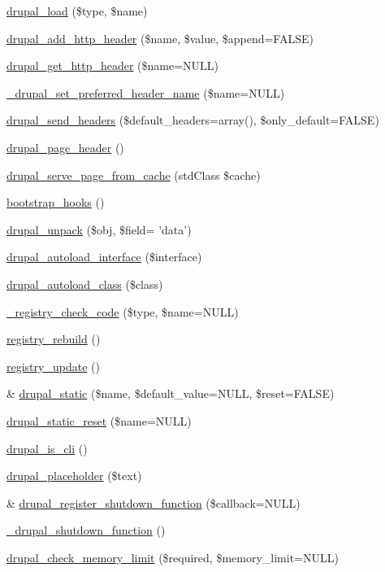 \begin{DoxyCompactItemize}
\item 
\hyperlink{bootstrap_8inc_a13a2254228f213a980dc1f09886b8802}{drupal\_\-load} (\$type, \$name)
\item 
\hyperlink{bootstrap_8inc_ad4ff2b2cf5a2fb632c2c869bc1a5a70f}{drupal\_\-add\_\-http\_\-header} (\$name, \$value, \$append=FALSE)
\item 
\hyperlink{bootstrap_8inc_a159cce492ef9bed6e8a1dd33227fd11e}{drupal\_\-get\_\-http\_\-header} (\$name=NULL)
\item 
\hyperlink{bootstrap_8inc_a5a8f423c6c77a609be5dc291e52470fb}{\_\-drupal\_\-set\_\-preferred\_\-header\_\-name} (\$name=NULL)
\item 
\hyperlink{bootstrap_8inc_a903274a2d3421ae33eaa053b36ac9855}{drupal\_\-send\_\-headers} (\$default\_\-headers=array(), \$only\_\-default=FALSE)
\item 
\hyperlink{bootstrap_8inc_a05f3dc0377da7898b9cb53977c30cca6}{drupal\_\-page\_\-header} ()
\item 
\hyperlink{bootstrap_8inc_ae09cf8051ec110fd6ce67f4a3b77a3fb}{drupal\_\-serve\_\-page\_\-from\_\-cache} (stdClass \$cache)
\item 
\hyperlink{bootstrap_8inc_a7a24c0b200b76c22c63b99e935e1bd5a}{bootstrap\_\-hooks} ()
\item 
\hyperlink{bootstrap_8inc_a4ca39fd7bed1a45e340f86bc2d59224d}{drupal\_\-unpack} (\$obj, \$field= 'data')
\item 
\hyperlink{group__registry_gaf7822bbec92566b95a44dc1c224389e8}{drupal\_\-autoload\_\-interface} (\$interface)
\item 
\hyperlink{group__registry_ga0fee2e4ebba5986067aa486c3436f51e}{drupal\_\-autoload\_\-class} (\$class)
\item 
\hyperlink{group__registry_gac399c501a8a90c383ea9a901a3a45ed6}{\_\-registry\_\-check\_\-code} (\$type, \$name=NULL)
\item 
\hyperlink{group__registry_ga63939dbdcf7950c97292f7d341f6d339}{registry\_\-rebuild} ()
\item 
\hyperlink{group__registry_gaab1bcea9fb061684c700676aa5ebe608}{registry\_\-update} ()
\item 
\& \hyperlink{group__schemaapi_ga498392997d598f196f35805de85d8b21}{drupal\_\-static} (\$name, \$default\_\-value=NULL, \$reset=FALSE)
\item 
\hyperlink{group__schemaapi_ga714b5ed0b14c43b61eef0c895598c5c4}{drupal\_\-static\_\-reset} (\$name=NULL)
\item 
\hyperlink{group__schemaapi_gac880b82ae302f9d15c64d264a269d1f4}{drupal\_\-is\_\-cli} ()
\item 
\hyperlink{group__schemaapi_ga4ab49ad51d8b93bb296a8492296d655b}{drupal\_\-placeholder} (\$text)
\item 
\& \hyperlink{group__php__wrappers_gac7eaf11b49995f7f539f5c830a65b34f}{drupal\_\-register\_\-shutdown\_\-function} (\$callback=NULL)
\item 
\hyperlink{group__schemaapi_ga8da38564ce2a3c92aa5103da6ae2a315}{\_\-drupal\_\-shutdown\_\-function} ()
\item 
\hyperlink{group__schemaapi_gad3a1c91d672f6e9cf9be66557db148fe}{drupal\_\-check\_\-memory\_\-limit} (\$required, \$memory\_\-limit=NULL)
\end{DoxyCompactItemize}
